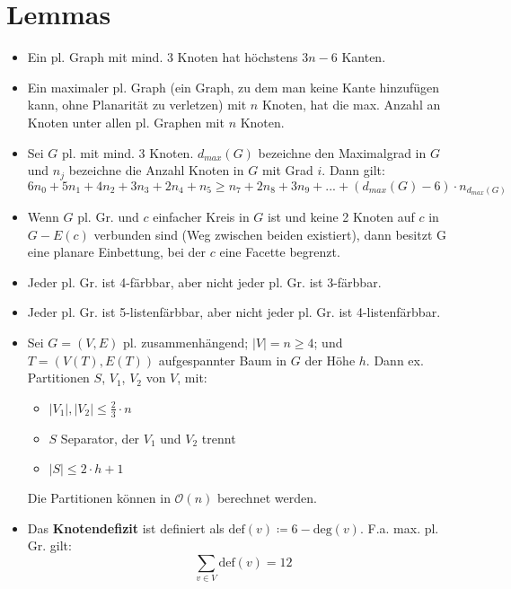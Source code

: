 \documentclass[a4paper,11pt]{report}
\begin{document}
\chapter{Lemmas}
\begin{itemize}
    \item Ein pl. Graph mit mind. 3 Knoten hat höchstens $3n-6$ Kanten.
    \item Ein maximaler pl. Graph (ein Graph, zu dem man keine Kante hinzufügen kann, ohne Planarität zu verletzen) mit $n$ Knoten, hat die max. Anzahl an Knoten unter allen pl. Graphen mit $n$ Knoten.
    \item Sei $G$ pl. mit mind. 3 Knoten. $d_{max}(G)$ bezeichne den Maximalgrad in $G$ und $n_j$ bezeichne die Anzahl Knoten in $G$ mit Grad $i$. Dann gilt: \[6 n_0 + 5 n_1 + 4 n_2 + 3 n_3 + 2 n_4 + n_5 \geq n_7 + 2 n_8 + 3 n_9 + ... + (d_{max}(G) - 6) \cdot n_{d_{max}(G)}\]
    \item Wenn $G$ pl. Gr. und $c$ einfacher Kreis in $G$ ist und keine 2 Knoten auf $c$ in $G - E(c)$ verbunden sind (Weg zwischen beiden existiert), dann besitzt G eine planare Einbettung, bei der $c$ eine Facette begrenzt.
    \item Jeder pl. Gr. ist 4-färbbar, aber nicht jeder pl. Gr. ist 3-färbbar.
    \item Jeder pl. Gr. ist 5-listenfärbbar, aber nicht jeder pl. Gr. ist 4-listenfärbbar.
    \item Sei $G = (V, E)$ pl. zusammenhängend; $|V| = n \geq 4$; und $T = (V(T), E(T))$ aufgespannter Baum in $G$ der Höhe $h$. Dann ex. Partitionen $S$, $V_1$, $V_2$ von $V$, mit:
    \begin{itemize}
        \item $|V_1|, |V_2| \leq \frac{2}{3} \cdot n$
        \item $S$ Separator, der $V_1$ und $V_2$ trennt
        \item $|S| \leq 2 \cdot h + 1$
    \end{itemize}
    Die Partitionen können in $\mathcal{O}(n)$ berechnet werden.

    \item Das {\bf Knotendefizit} ist definiert als $\text{def}(v) \coloneqq 6 - \text{deg}(v)$. F.a. max. pl. Gr. gilt: $$\sum_{v \in V} \text{def}(v) = 12$$
\end{itemize}


\glsaddallunused
\printglossaries
\end{document}
